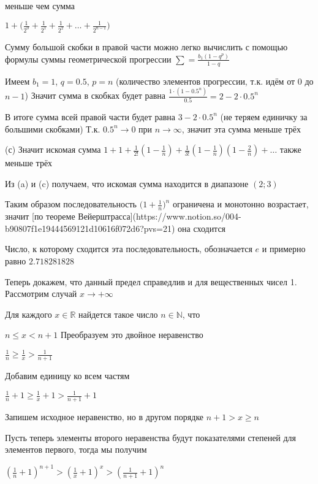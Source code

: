 меньше чем сумма

$\displaystyle{1 + \bigg(\frac{1}{2^0} + \frac{1}{2^1} + \frac{1}{2^2} + \dots + \frac{1}{2^{n - 1}} \bigg)}$

Сумму большой скобки в правой части можно легко вычислить с помощью формулы суммы геометрической прогрессии $\displaystyle{\sum = \frac{b_1 (1 - q^p)}{1 - q}}$

Имеем $b_1 = 1$, $q = 0.5$, $p = n$ (количество элементов прогрессии, т.к. идём от $0$ до $n - 1$)
Значит сумма в скобках будет равна $\displaystyle{\frac{1 \cdot (1 - 0.5^n)}{0.5} = 2 - 2 \cdot 0.5^n}$

В итоге сумма всей правой части будет равна $3 - 2 \cdot 0.5^n$ (не теряем единичку за большими скобками)
Т.к. $0.5^n \to 0$ при $n \to \infty$, значит эта сумма меньше трёх

(с) Значит искомая сумма $\displaystyle{1 + 1 + \frac{1}{2!} (1 - \frac1n) + \frac{1}{3!}(1 - \frac1n)(1 - \frac2n) + \dots}$
также меньше трёх

Из (a) и (c) получаем, что искомая сумма находится в диапазоне $(2;3)$

Таким образом последовательность $\displaystyle{\Big( 1 + \frac{1}{n} \Big)^n}$ ограничена и монотонно возрастает, значит [по теореме Вейерштрасса](https://www.notion.so/004-b90807f1e19444569121d10616f072d6?pvs=21) она сходится

Число, к которому сходится эта последовательность, обозначается $e$ и примерно равно $2.718281828$


Теперь докажем, что данный предел справедлив и для вещественных чисел
1. Рассмотрим случай $x \to +\infty$

Для каждого $x \in \mathbb{R}$ найдется такое число $n \in \mathbb{N}$, что

$n \le x \lt n + 1$
Преобразуем это двойное неравенство

$\displaystyle{\frac{1}{n} \ge \frac{1}{x} \gt \frac{1}{n + 1}}$

Добавим единицу ко всем частям

$\displaystyle{\frac{1}{n} + 1 \ge \frac{1}{x} + 1 \gt \frac{1}{n + 1} + 1}$

Запишем исходное неравенство, но в другом порядке
$\displaystyle{n + 1 \gt x \ge n}$

Пусть теперь элементы второго неравенства будут показателями степеней для элементов первого, тогда мы получим

$\displaystyle{(\frac{1}{n} + 1)^{n + 1} \gt (\frac{1}{x} + 1)^x \gt (\frac{1}{n + 1} + 1)^n}$

